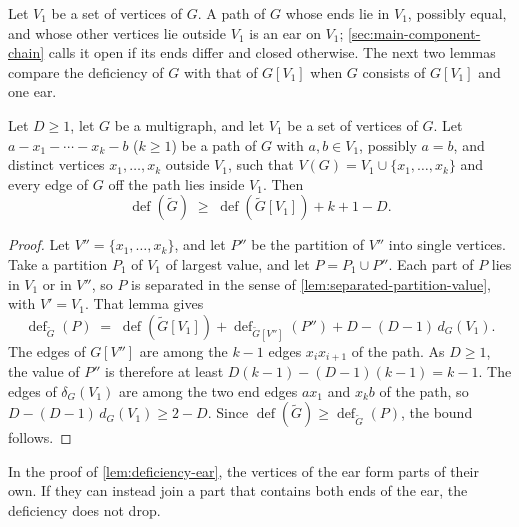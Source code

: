 Let $V_1$ be a set of vertices of $G$. A path of $G$ whose ends lie in
$V_1$, possibly equal, and whose other vertices lie outside $V_1$ is an
ear on $V_1$; \cref{sec:main-component-chain} calls it open if its ends
differ and closed otherwise. The next two lemmas compare the deficiency
of $G$ with that of $G[V_1]$ when $G$ consists of $G[V_1]$ and one ear.

\begin{lemma}
  \label{lem:deficiency-ear}
  \leanok
  Let $D \ge 1$, let $G$ be a multigraph, and let $V_1$ be a set of
  vertices of $G$. Let $a - x_1 - \cdots - x_k - b$ ($k \ge 1$) be a path
  of $G$ with $a, b \in V_1$, possibly $a = b$, and distinct vertices
  $x_1, \dots, x_k$ outside $V_1$, such that
  $V(G) = V_1 \cup \{x_1, \dots, x_k\}$ and every edge of $G$ off the
  path lies inside $V_1$. Then
  \[
    \operatorname{def}(\tilde G) \;\ge\;
    \operatorname{def}(\tilde G[V_1]) + k + 1 - D.
  \]
\end{lemma}
\begin{proof}
  \leanok
  Let $V'' = \{x_1, \dots, x_k\}$, and let $P''$ be the partition of
  $V''$ into single vertices. Take a partition $P_1$ of $V_1$ of largest
  value, and let $P = P_1 \cup P''$. Each part of $P$ lies in $V_1$ or in
  $V''$, so $P$ is separated in the sense of
  \cref{lem:separated-partition-value}, with $V' = V_1$. That lemma
  gives
  \[
    \operatorname{def}_{\tilde G}(P) \;=\;
    \operatorname{def}(\tilde G[V_1])
    + \operatorname{def}_{\tilde G[V'']}(P'')
    + D - (D-1)\,d_G(V_1).
  \]
  The edges of $G[V'']$ are among the $k - 1$ edges $x_i x_{i+1}$ of
  the path. As $D \ge 1$, the value of $P''$ is therefore at least
  $D(k - 1) - (D - 1)(k - 1) = k - 1$. The edges of $\delta_G(V_1)$ are
  among the two end edges $a x_1$ and $x_k b$ of the path, so
  $D - (D-1)\,d_G(V_1) \ge 2 - D$. Since
  $\operatorname{def}(\tilde G) \ge \operatorname{def}_{\tilde G}(P)$,
  the bound follows.
\end{proof}

In the proof of \cref{lem:deficiency-ear}, the vertices of the ear form
parts of their own. If they can instead join a part that contains both ends of
the ear, the deficiency does not drop.

